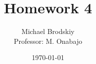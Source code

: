 


\title{Homework 4}
\date{\today}
\author{Michael Brodskiy\\ \small Professor: M. Onabajo}



\maketitle

